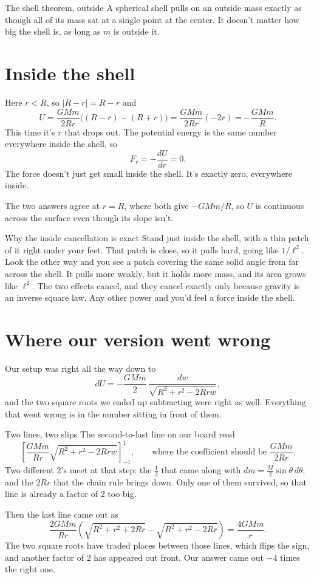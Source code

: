 \documentclass[11pt]{article}
\begin{document}
\begin{psidea}{The shell theorem, outside}{}
A spherical shell pulls on an outside mass exactly as though all of its mass sat at a
single point at the center. It doesn't matter how big the shell is, as long as $m$ is
outside it.
\end{psidea}

\section*{Inside the shell}

Here $r < R$, so $|R-r| = R - r$ and
\[
U = \frac{GMm}{2Rr}\big((R-r) - (R+r)\big)
  = \frac{GMm}{2Rr}(-2r)
  = -\frac{GMm}{R} .
\]
This time it's $r$ that drops out. The potential energy is the same number everywhere
inside the shell, so
\[
F_r = -\frac{dU}{dr} = 0 .
\]
The force doesn't just get small inside the shell. It's exactly zero, everywhere inside.

The two answers agree at $r = R$, where both give $-GMm/R$, so $U$ is continuous across
the surface even though its slope isn't.

\begin{psremark}{Why the inside cancellation is exact}{}
Stand just inside the shell, with a thin patch of it right under your feet. That patch is
close, so it pulls hard, going like $1/\ell^2$. Look the other way and you see a patch
covering the same solid angle from far across the shell. It pulls more weakly, but it
holds more mass, and its area grows like $\ell^2$. The two effects cancel, and they cancel
exactly only because gravity is an inverse square law. Any other power and you'd feel a
force inside the shell.
\end{psremark}

\section*{Where our version went wrong}

Our setup was right all the way down to
\[
dU = -\frac{GMm}{2}\,\frac{dw}{\sqrt{R^2+r^2-2Rrw}},
\]
and the two square roots we ended up subtracting were right as well. Everything that went
wrong is in the number sitting in front of them.

\begin{pswrong*}{Two lines, two slips}{}
The second-to-last line on our board read
\[
\left[\frac{GMm}{Rr}\sqrt{R^2+r^2-2Rrw}\right]_{-1}^{1},
\qquad\text{where the coefficient should be } \frac{GMm}{2Rr}.
\]
Two different 2's meet at that step: the $\tfrac12$ that came along with
$dm = \tfrac{M}{2}\sin\theta\,d\theta$, and the $2Rr$ that the chain rule brings down.
Only one of them survived, so that line is already a factor of $2$ too big.

Then the last line came out as
\[
\frac{2GMm}{Rr}\left(\sqrt{R^2+r^2+2Rr}-\sqrt{R^2+r^2-2Rr}\right) = \frac{4GMm}{r} .
\]
The two square roots have traded places between those lines, which flips the sign, and
another factor of $2$ has appeared out front. Our answer came out $-4$ times the right
one.
\end{pswrong*}
\end{document}
